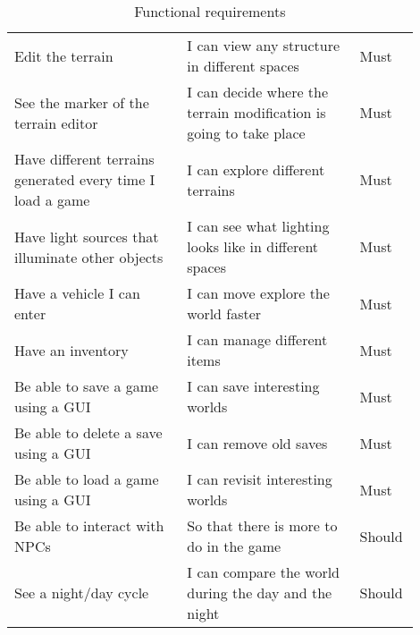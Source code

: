 \begin{table}[!htb]
\begin{tabular}{|p{0.4\linewidth}|p{0.4\linewidth}|p{0.1\linewidth}|}
        Edit the terrain                                           & I can view any structure in different spaces                       & Must           \\
        See the marker of the terrain editor                       & I can decide where the terrain modification is going to take place & Must           \\
        Have different terrains generated every time I load a game & I can explore different terrains                                   & Must           \\
        Have light sources that illuminate other objects           & I can see what lighting looks like in different spaces             & Must           \\
        Have a vehicle I can enter                                 & I can move explore the world faster                                & Must           \\
        Have an inventory                                          & I can manage different items                                       & Must           \\
        Be able to save a game using a GUI                         & I can save interesting worlds                                      & Must           \\
        Be able to delete a save using a GUI                       & I can remove old saves                                             & Must           \\
        Be able to load a game using a GUI                         & I can revisit interesting worlds                                   & Must           \\
        Be able to interact with NPCs                              & So that there is more to do in the game                            & Should         \\
        See a night/day cycle                                      & I can compare the world during the day and the night               & Should         \\
        \hline
    \end{tabular}
    \caption{Functional requirements}
    \label{tab:functional_requirements}
\end{table}